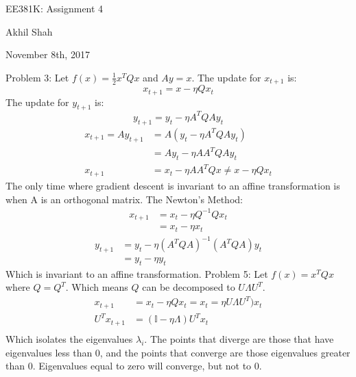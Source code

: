\documentclass{article}
\begin{document}
\begin{center}
    {\huge EE381K: Assignment 4}
\end{center}
\begin{center}
    Akhil Shah
\end{center}
\begin{center}
    November 8th, 2017
\end{center}

{\large Problem 3:}
\newline
Let $f(x) = \frac{1}{2}x^TQx$ and $ Ay = x$. 
The update for $x_{t+1}$ is:
\begin{equation*}
	x_{t+1} = x - \eta Qx_t
\end{equation*}
The update for $y_{t+1}$ is:
\begin{equation*}
	y_{t+1} = y_t - \eta A^TQAy_t
\end{equation*}
\begin{align*}
	x_{t+1} = Ay_{t+1} &= A(y_t - \eta A^TQAy_t) \\
	&= Ay_t - \eta AA^TQAy_t \\
	x_{t+1} &= x_t - \eta AA^TQx \neq x - \eta Qx_t
\end{align*}
The only time where gradient descent is invariant to an affine transformation is when A is an orthogonal matrix. \newline
The Newton's Method:
\begin{align*}
	x_{t+1} &= x_t - \eta Q^{-1}Qx_t \\
	&= x_t - \eta x_t
\end{align*}
\begin{align*}
	y_{t+1} &= y_t - \eta (A^TQA)^{-1}(A^TQA)y_t \\
	&= y_t - \eta y_t
\end{align*}
Which is invariant to an affine transformation. 
\noindent
{\large Problem 5:}
\newline
Let $f(x) = x^T Q x$ where $Q = Q^T$. Which means $Q$ can be decomposed to $U\Lambda U^T$. 
\begin{align*}
	x_{t+1} &= x_t - \eta Q x_t = x_t = \eta U \Lambda U^T) x_t \\
	U^T x_{t+1} &= (\mathbb{I} - \eta \Lambda)U^T x_t \\
\end{align*}
Which isolates the eigenvalues $\lambda_i$. The points that diverge are those that have eigenvalues less than 0, and the points that converge are those eigenvalues greater than 0. Eigenvalues equal to zero will converge, but not to 0. 
\end{document}
